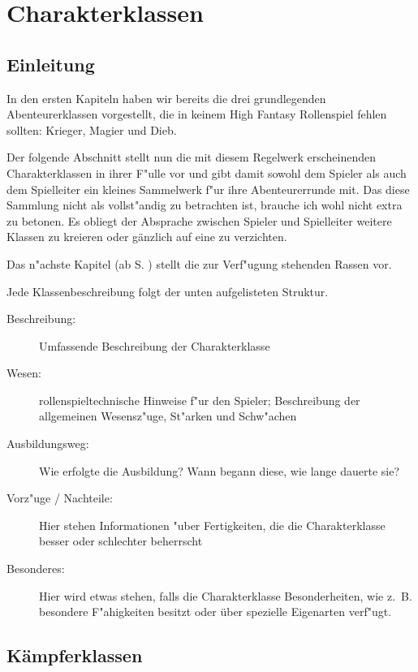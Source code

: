 \chapter{Charakterklassen}
\label{charakterklassen}
\section{Einleitung}
\par In den ersten Kapiteln haben wir bereits die drei grundlegenden Abenteurerklassen 
vorgestellt, die in keinem High Fantasy Rollenspiel fehlen sollten: Krieger, Magier und Dieb.
\par Der folgende Abschnitt stellt nun die mit diesem Regelwerk erscheinenden Charakterklassen in ihrer F"ulle 
vor und gibt damit sowohl dem Spieler als auch dem Spielleiter ein kleines Sammelwerk f"ur ihre Abenteurerrunde 
mit. Das diese Sammlung nicht als vollst"andig zu betrachten ist, brauche ich wohl nicht extra zu betonen. 
Es obliegt der Absprache zwischen Spieler und Spielleiter weitere Klassen zu kreieren oder gänzlich auf eine
zu verzichten.
\par Das n"achste Kapitel (ab S. \pageref{dierassen}) stellt die zur Verf"ugung stehenden Rassen vor.
\par Jede Klassenbeschreibung folgt der unten aufgelisteten Struktur.
\begin{description}
\item[Beschreibung:]Umfassende Beschreibung der Charakterklasse
\item[Wesen:]rollenspieltechnische Hinweise f"ur den Spieler; Beschreibung der allgemeinen 
Wesensz"uge, St"arken und Schw"achen
\item[Ausbildungsweg:]Wie erfolgte die Ausbildung? Wann begann 
diese, wie lange dauerte sie?
\item[Vorz"uge / Nachteile:]Hier stehen Informationen "uber Fertigkeiten, 
die die Charakterklasse besser oder schlechter beherrscht
\item[Besonderes:]Hier wird etwas stehen, falls die Charakterklasse Besonderheiten, wie \mbox{z. B.} besondere 
F"ahigkeiten besitzt oder über spezielle Eigenarten verf"ugt.
\end{description}

\newpage
\section{Kämpferklassen}

\newpage



